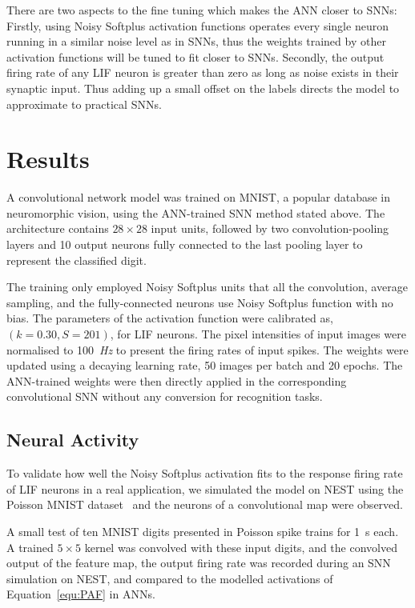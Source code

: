 \documentclass{article}
\begin{document}
There are two aspects to the fine tuning which makes the ANN closer to SNNs:
Firstly, using Noisy Softplus activation functions operates every single neuron running in a similar noise level as in SNNs, thus the weights trained by other activation functions will be tuned to fit closer to SNNs.
Secondly, the output firing rate of any LIF neuron is greater than zero as long as noise exists in their synaptic input.
Thus adding up a small offset on the labels directs the model to approximate to practical SNNs. 

\section{Results}
\label{sec:result}
A convolutional network model was trained on MNIST,
a popular database in neuromorphic vision, using the ANN-trained SNN method stated above.
The architecture contains $28\times28$ input units, followed by two convolution-pooling layers and 10 output neurons fully connected to the last pooling layer to represent the classified digit.

The training only employed Noisy Softplus units that all the convolution, average sampling, and the fully-connected neurons use Noisy Softplus function with no bias.
The parameters of the activation function were calibrated as, $(k=0.30, S=201)$,  for LIF neurons.
The pixel intensities of input images were normalised to 100~\textit{Hz} to present the firing rates of input spikes.
The weights were updated using a decaying learning rate, 50 images per batch and 20 epochs.
The ANN-trained weights were then directly applied in the corresponding convolutional SNN without any conversion for recognition tasks.


\subsection{Neural Activity}
To validate how well the Noisy Softplus activation fits to the response firing rate of LIF neurons in a real application, we simulated the model on NEST using the Poisson MNIST dataset~\cite{liu2016bench} and the neurons of a convolutional map were observed.

A small test of ten MNIST digits presented in Poisson spike trains for 1~s each.
A trained $5\times5$ kernel was convolved with these input digits, and the convolved output of the feature map, the output firing rate was recorded during an SNN simulation on NEST, and compared to the modelled activations of Equation~\ref{equ:PAF} in ANNs.
\end{document}
